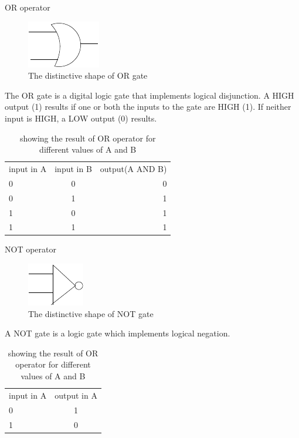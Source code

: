 \documentclass{beamer}
\begin{document}
\begin{frame}{OR operator}

\begin{figure}
\centering
\caption{ The distinctive shape of OR gate}
\label{or:or}
\includegraphics{or}
\end{figure}
 The OR gate is a digital logic gate that implements logical disjunction.
 A HIGH output (1) results if one or both the inputs to the gate are HIGH (1). 
 If neither input is HIGH, a LOW output (0) results.
  \begin{table}
   \centering
   \begin{tabular}{|l c r|}
      input in A	&input in B	&output(A AND B) \\
      0			&0		&0		\\
      0			&1		&1		\\
      1			&0		&1		\\
      1			&1		&1
   \end{tabular}
\caption{showing the result of OR operator for different values of A and B}
   \end{table}
\end{frame}

\begin{frame}{NOT operator}
\begin{figure}
\centering
\caption{ The distinctive shape of NOT gate}
\label{not:not}
\includegraphics{not}
\end{figure}

A NOT gate is a logic gate which implements logical negation. 
\begin{table}
   \centering
   \begin{tabular}{|l c|}
      input in A	&output in A \\
      0			&1		\\
      1			&0		\\
 
   \end{tabular}
\caption{showing the result of OR operator for different values of A and B}
   \end{table}

   \end{frame}
\end{document}
